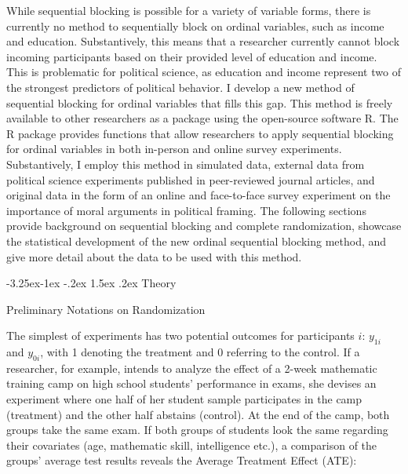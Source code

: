 \documentclass[12pt,]{article}
\makeatletter
\renewcommand\subsection{\@startsection{subsection}{2}{\z@}%
                                     {-3.25ex\@plus -1ex \@minus -.2ex}
                                     {1.5ex \@plus .2ex}
                                     {\normalsize\bfseries}} %
\renewcommand\subsubsection{\@startsection{subsubsection}{3}{\z@}
                                     {-3.25ex\@plus -1ex \@minus -.2ex}
                                     {1.5ex \@plus .2ex}
                                     {\normalsize\itshape}} %
\makeatother
\begin{document}
While sequential blocking is possible for a variety of variable forms,
there is currently no method to sequentially block on ordinal variables,
such as income and education. Substantively, this means that a
researcher currently cannot block incoming participants based on their
provided level of education and income. This is problematic for
political science, as education and income represent two of the
strongest predictors of political behavior. I develop a new method of
sequential blocking for ordinal variables that fills this gap. This
method is freely available to other researchers as a package using the
open-source software R. The R package provides functions that allow
researchers to apply sequential blocking for ordinal variables in both
in-person and online survey experiments. Substantively, I employ this
method in simulated data, external data from political science
experiments published in peer-reviewed journal articles, and original
data in the form of an online and face-to-face survey experiment on the
importance of moral arguments in political framing. The following
sections provide background on sequential blocking and complete
randomization, showcase the statistical development of the new ordinal
sequential blocking method, and give more detail about the data to be
used with this method.

\subsection{Theory}\label{seq-theory}

\subsubsection{Preliminary Notations on
Randomization}\label{seq-notations}

The simplest of experiments has two potential outcomes for participants
\(i\): \(y_{1i}\) and \(y_{0i}\), with 1 denoting the treatment and 0
referring to the control. If a researcher, for example, intends to
analyze the effect of a 2-week mathematic training camp on high school
students' performance in exams, she devises an experiment where one half
of her student sample participates in the camp (treatment) and the other
half abstains (control). At the end of the camp, both groups take the
same exam. If both groups of students look the same regarding their
covariates (age, mathematic skill, intelligence etc.), a comparison of
the groups' average test results reveals the Average Treatment Effect
(ATE):
\end{document}
